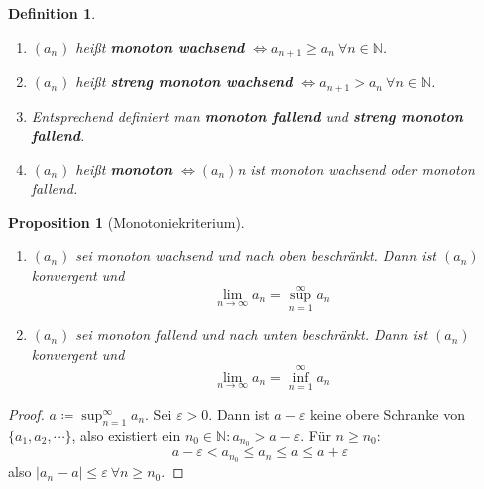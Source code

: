 \documentclass[titlepage,ngerman,a4paper,headsepline,DIV15,halfparskip*,14pt]{scrartcl}
\newcommand{\N}{\mathbb{N}}
\theoremstyle{dotless}
\newtheorem{prop}[satz]{Proposition}
\newtheorem*{definition}{Definition}
\begin{document}
       
\begin{definition}\ 
	\begin{enumerate}
		\item $(a_{n})$ hei{\ss}t \textbf{monoton wachsend} $\iff a_{n+1} \geq a_{n} ~\forall n \in \N$.
		\item $(a_{n})$ hei{\ss}t \textbf{streng monoton wachsend} $\iff a_{n+1} > a_{n} ~\forall n \in \N$.
		\item Entsprechend definiert man \textbf{monoton fallend} und \textbf{streng monoton fallend}.
		\item $(a_{n})$ hei{\ss}t \textbf{monoton} $\iff (a_{n})$n ist monoton wachsend oder monoton fallend.
	\end{enumerate}
\end{definition}

\begin{prop}[Monotoniekriterium]\ \label{prop:2.3}
	\begin{enumerate}
		\item $(a_{n})$ sei monoton wachsend und nach oben beschränkt. Dann ist $(a_{n})$ konvergent und 
			$$
				\lim_{n \rightarrow \infty} a_{n} = \sup_{n = 1}^{\infty} a_{n}
			$$
		\item $(a_{n})$ sei monoton fallend und nach unten beschränkt. Dann ist $(a_{n})$ konvergent und 
			$$
				\lim_{n \rightarrow \infty} a_{n} = \inf_{n = 1}^{\infty} a_{n}
			$$
	\end{enumerate}
\end{prop}

\begin{proof}
		$a \coloneqq \sup_{n = 1}^{\infty} a_{n}$. Sei $\varepsilon > 0$. Dann ist $a - \varepsilon$ keine obere Schranke von $\{ a_{1}, a_{2}, \cdots \}$, also existiert ein $n_{0} \in \N: a_{n_{0}} > a - \varepsilon$. Für $n \geq n_{0}$:
			$$
				a - \varepsilon < a_{n_{0}} \leq a_{n} \leq a \leq a + \varepsilon
			$$
			also $|a_{n} - a| \leq \varepsilon ~\forall n \geq n_{0}$.
\end{proof}

\begin{figure*}[h]
	\centering
\end{figure*}
\end{document}
